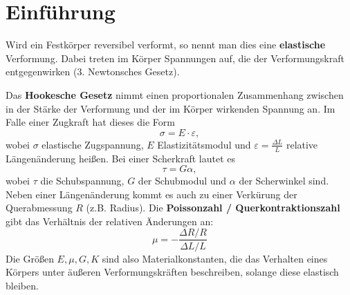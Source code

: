 \section{Einführung}
Wird ein Festkörper reversibel verformt, so nennt man dies eine \textbf{elastische} Verformung.
Dabei treten im Körper Spannungen auf, die der Verformungskraft entgegenwirken (3. Newtonsches Gesetz).

Das \textbf{Hookesche Gesetz} nimmt einen proportionalen Zusammenhang zwischen in der Stärke der Verformung und der im Körper wirkenden Spannung an.
Im Falle einer Zugkraft hat dieses die Form
\begin{equation}
  \sigma = E\cdot \varepsilon,
  \label{eq:hookzug}
\end{equation}
wobei $\sigma$ elastische Zugspannung, $E$ Elastizitätsmodul und $\varepsilon=\frac{\Delta L}{L}$ relative Längenänderung heißen.
Bei einer Scherkraft lautet es
\begin{equation}
  \tau = G\alpha,
  \label{eq:hookscher}
\end{equation}
wobei $\tau$ die Schubspannung, $G$ der Schubmodul und $\alpha$ der Scherwinkel sind. \\

Neben einer Längenänderung kommt es auch zu einer Verkürung der Querabmessung $R$ (z.B. Radius). Die \textbf{Poissonzahl / Querkontraktionszahl} gibt das Verhältnis der relativen Änderungen an:
\begin{equation}
  \mu=-\frac{\Delta R/R}{\Delta L/L}
  \label{eq:poisson}
\end{equation}
Die Größen $E, \mu, G, K$ sind also Materialkonstanten, die das Verhalten eines Körpers unter äußeren Verformungskräften beschreiben, solange diese elastisch bleiben. \\

